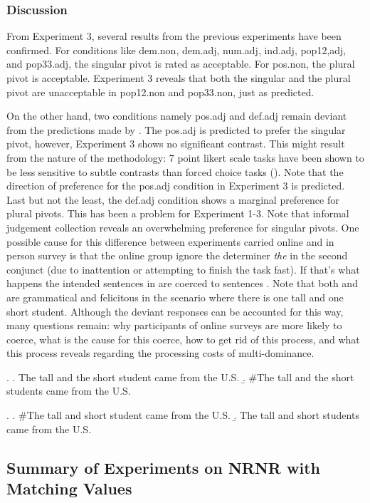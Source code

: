 \documentclass[
  11pt          %
  ,letterpaper  %
  ,center       %
  ,noupper      %
  ]{uconnthesis2}
\begin{document}
\subsubsection{Discussion}

From Experiment 3, several results from the previous experiments have been confirmed. For conditions like dem.non, dem.adj, num.adj, ind.adj, pop12,adj, and pop33.adj, the singular pivot is rated as acceptable. For pos.non, the plural pivot is acceptable. Experiment 3 reveals that both the singular and the plural pivot are unacceptable in pop12.non and pop33.non, just as \cite{Shen:ip2} predicted.

On the other hand, two conditions namely pos.adj and def.adj remain deviant from the predictions made by \cite{Shen:2016}. The pos.adj is predicted to prefer the singular pivot, however, Experiment 3 shows no significant contrast. This might result from the nature of the methodology: 7 point likert scale tasks have been shown to be less sensitive to subtle contrasts than forced choice tasks (\citealt{Sprouse:2013}). Note that the direction of preference for the pos.adj condition in Experiment 3 is predicted. Last but not the least, the def.adj condition shows a marginal preference for plural pivots. This has been a problem for Experiment 1-3. Note that informal judgement collection reveals an overwhelming preference for singular pivots. One possible cause for this difference between experiments carried online and in person survey is that the online group ignore the determiner \textit{the} in the second conjunct (due to inattention or attempting to finish the task fast). If that's what happens the intended sentences in \Next are coerced to sentences \NNext. Note that both \Next[a] and \NNext[b] are grammatical and felicitous in the scenario where there is one tall and one short student. Although the deviant responses can be accounted for this way, many questions remain: why participants of online surveys are more likely to coerce, what is the cause for this coerce, how to get rid of this process, and what this process reveals regarding the processing costs of multi-dominance.

\ex. 
\a. The tall and the short student came from the U.S.
\b. \#The tall and the short students came from the U.S.

\ex. 
\a. \#The tall and short student came from the U.S.
\b. The tall and short students came from the U.S.

\subsection{Summary of Experiments on NRNR with Matching Values}
\end{document}
